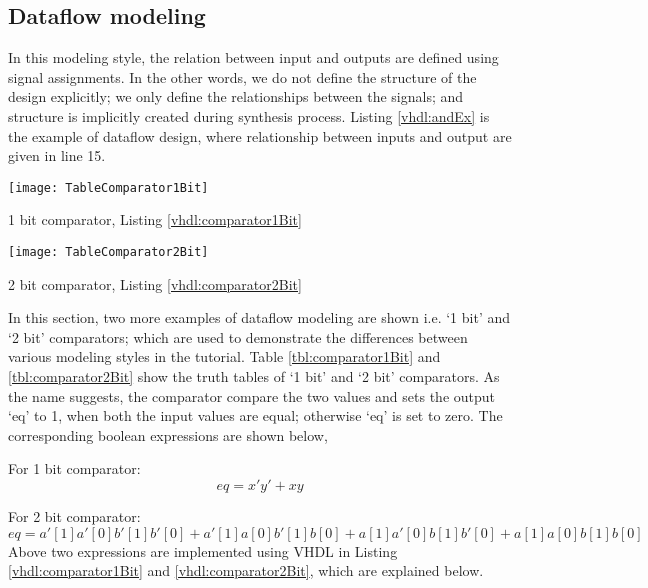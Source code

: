 \subsection{Dataflow modeling}\label{sec:dataflowOverview}
In this modeling style, the relation between input and outputs are defined using signal assignments. In the other words, we do not define the structure of the design explicitly; we only define the relationships between the signals; and structure is implicitly created during synthesis process. Listing \ref{vhdl:andEx} is the example of dataflow design, where relationship between inputs and output are given in line 15. 

\begin{table}
	\centering
	\texttt{[image: TableComparator1Bit]}
	\caption{1 bit comparator, Listing \ref{vhdl:comparator1Bit}}
	\label{tbl:comparator1Bit}
\end{table}

\begin{table}
	\centering
	\texttt{[image: TableComparator2Bit]}
	\caption{2 bit comparator, Listing \ref{vhdl:comparator2Bit}}
	\label{tbl:comparator2Bit}
\end{table}

In this section, two more examples of dataflow modeling are shown i.e. `1 bit' and `2 bit' comparators; which are used to demonstrate the differences between various modeling styles in the tutorial. Table \ref{tbl:comparator1Bit} and \ref{tbl:comparator2Bit} show the truth tables of `1 bit' and `2 bit' comparators.  As the name suggests, the comparator compare the two values and sets the output `eq' to 1, when both the input values are equal; otherwise `eq' is set to zero. The corresponding boolean expressions are shown below, 

For 1 bit comparator: 
\begin{equation}
	eq = x' y' + x y
	\label{eq:1bitComparator}
\end{equation} 

For 2 bit comparator: 
\begin{equation}
	eq = a'[1]a'[0]b'[1]b'[0] + a'[1]a[0]b'[1]b[0] + a[1]a'[0]b[1]b'[0] + a[1]a[0]b[1]b[0]
	\label{eq:2bitComparator}
\end{equation} 
Above two expressions are implemented using VHDL in Listing \ref{vhdl:comparator1Bit} and \ref{vhdl:comparator2Bit}, which are explained below.

